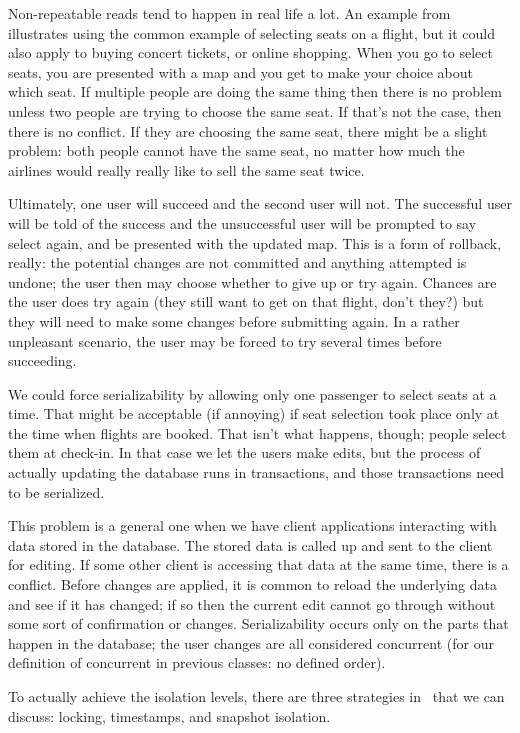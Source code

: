 Non-repeatable reads tend to happen in real life a lot. An example from~\cite{dsc} illustrates using the common example of selecting seats on a flight, but it could also apply to buying concert tickets, or online shopping. When you go to select seats, you are presented with a map and you get to make your choice about which seat. If multiple people are doing the same thing then there is no problem unless two people are trying to choose the same seat. If that's not the case, then there is no conflict. If they are choosing the same seat, there might be a slight problem: both people cannot have the same seat, no matter how much the airlines would really really like to sell the same seat twice.

Ultimately, one user will succeed and the second user will not. The successful user will be told of the success and the unsuccessful user will be prompted to say select again, and be presented with the updated map. This is a form of rollback, really: the potential changes are not committed and anything attempted is undone; the user then may choose whether to give up or try again. Chances are the user does try again (they still want to get on that flight, don't they?) but they will need to make some changes before submitting again. In a rather unpleasant scenario, the user may be forced to try several times before succeeding.

We could force serializability by allowing only one passenger to select seats at a time. That might be acceptable (if annoying) if seat selection took place only at the time when flights are booked. That isn't what happens, though; people select them at check-in. In that case we let the users make edits, but the process of actually updating the database runs in transactions, and those transactions need to be serialized. 

This problem is a general one when we have client applications interacting with data stored in the database. The stored data is called up and sent to the client for editing. If some other client is accessing that data at the same time, there is a conflict. Before changes are applied, it is common to reload the underlying data and see if it has changed; if so then the current edit cannot go through without some sort of confirmation or changes. Serializability occurs only on the parts that happen in the database; the user changes are all considered concurrent (for our definition of concurrent in previous classes: no defined order).

To actually achieve the isolation levels, there are three strategies in~\cite{dsc} that we can discuss: locking, timestamps, and snapshot isolation.

